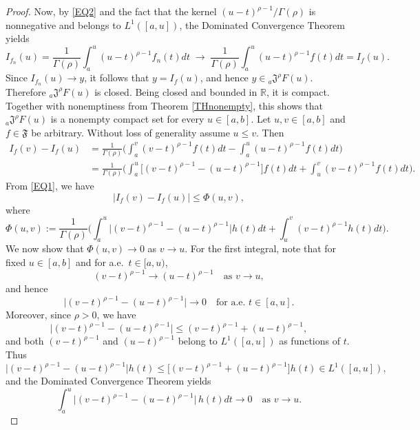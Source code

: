 \documentclass[a4paper,12pt,reqno]{amsart}
\numberwithin{equation}{section}
\theoremstyle{definition}
\theoremstyle{remark}
\numberwithin{equation}{section}
\begin{document}
\begin{proof}
Now, by \eqref{EQ2} and the fact that the kernel 
$(u-t)^{\rho-1}/\Gamma(\rho)$ is nonnegative and belongs to $L^{1}([a,u])$,
the Dominated Convergence Theorem yields
\[
I_{f_n}(u)
=
\frac{1}{\Gamma(\rho)}\int_{a}^{u}(u-t)^{\rho-1}f_n(t)dt
\;\longrightarrow\;
\frac{1}{\Gamma(\rho)}\int_{a}^{u}(u-t)^{\rho-1}f(t)dt
=
I_f(u).
\]
Since $I_{f_n}(u)\to y$, it follows that $y=I_f(u)$, and hence  $y\in{}_{a}\mathfrak{J}^{\rho}F(u)$.  
Therefore ${}_{a}\mathfrak{J}^{\rho}F(u)$ is closed.  
Being closed and bounded in $\mathbb{R}$, it is compact.  
Together with nonemptiness from Theorem \ref{THnonempty}, this shows that  ${}_{a}\mathfrak{J}^{\rho}F(u)$ is a nonempty compact set for every  $u\in[a,b]$.
Let $u,v\in[a,b]$ and $f\in\mathfrak{F}$ be arbitrary. Without loss of generality assume $u\le v$. Then
\[
\begin{aligned}
I_f(v)-I_f(u)
&=
\frac{1}{\Gamma(\rho)}
\Bigg(
\int_{a}^{v}(v-t)^{\rho-1}f(t)dt
-
\int_{a}^{u}(u-t)^{\rho-1}f(t)dt
\Bigg) \\
&=
\frac{1}{\Gamma(\rho)}
\Bigg(
\int_{a}^{u}\big[(v-t)^{\rho-1}-(u-t)^{\rho-1}\big]f(t)dt
+
\int_{u}^{v}(v-t)^{\rho-1}f(t)dt
\Bigg).
\end{aligned}
\]
From \eqref{EQ1}, we have
$$\big|I_f(v)-I_f(u)\big| \le \Phi(u,v),$$
where
\[
\Phi(u,v) := \frac{1}{\Gamma(\rho)}
\Bigg( \int_{a}^{u}\big|(v-t)^{\rho-1}-(u-t)^{\rho-1}\big|h(t)dt + \int_{u}^{v}(v-t)^{\rho-1}h(t)dt \Bigg).
\]
We now show that $\Phi(u,v)\to 0$ as $v\to u$. For the first integral,
note that for fixed $u\in[a,b]$ and for a.e.~$t\in[a,u)$,
\[ (v-t)^{\rho-1}\to (u-t)^{\rho-1}
\quad\text{as }v\to u, \]
and hence
\[ \big|(v-t)^{\rho-1}-(u-t)^{\rho-1}\big|
\to 0 \quad\text{for a.e. }t\in[a,u]. \] 
 Moreover, since $\rho>0$, we have
\[ \big|(v-t)^{\rho-1}-(u-t)^{\rho-1}\big|
\le (v-t)^{\rho-1}+(u-t)^{\rho-1}, \]
and both $(v-t)^{\rho-1}$ and $(u-t)^{\rho-1}$ belong to $L^{1}([a,u])$ as functions of $t$. Thus
\[ \big|(v-t)^{\rho-1}-(u-t)^{\rho-1}\big|h(t) \le\big[(v-t)^{\rho-1}+(u-t)^{\rho-1}\big]h(t)\in L^{1}([a,u]), \]
and the Dominated Convergence Theorem yields
\[ \int_{a}^{u}\big|(v-t)^{\rho-1}-(u-t)^{\rho-1}\big|\,h(t)dt \longrightarrow 0 \quad\text{as }v\to u. \]


\end{proof}
\end{document}
